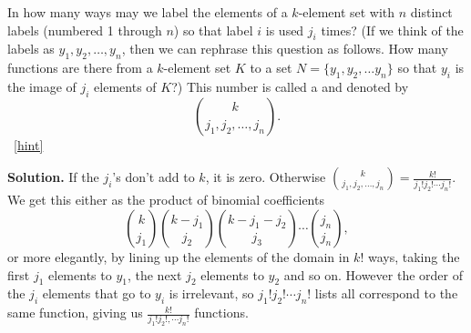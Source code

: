 \documentclass{book}
\begin{document}
\setcounter{project}{281}
\addtocounter{project}{-1}
\begin{activity}[]\label{activity-274}
\hypertarget{p-1493}{}%
In how many ways may we label the elements of a \(k\)-element set with \(n\) distinct labels (numbered 1 through \(n\)) so that label \(i\) is used \(j_i\) times? (If we think of the labels as \(y_1, y_2, \ldots, y_n\), then we can rephrase this question as follows.  How many functions are there from a \(k\)-element set \(K\) to a set \(N=\{y_1,y_2,\ldots y_n\}\) so that \(y_i\) is the image of \(j_i\) elements of \(K\)?) This number is called a  and denoted by%
\begin{equation*}
\binom{k}{j_1,j_2,\ldots, j_n}.
\end{equation*}
%
~\hfill{\tiny\hyperlink{a-281}{[hint]}\hypertarget{q-281}{}}\par\smallskip%
\noindent\textbf{Solution.}\hypertarget{solution-219}{}\quad%
\hypertarget{p-1496}{}%
If the \(j_i\)'s don't add to \(k\), it is zero.  Otherwise \(\binom{k}{j_1,j_2,\ldots, j_n} =
\frac{k!}{j_1!j_2!\cdots j_n!}\). We get this either as the product of binomial coefficients%
\begin{equation*}
\binom{k}{j_1}\binom{k-j_1}{j_2}\binom{k-j_1-j_2}{j_3}\cdots\binom{j_n}{j_n},
\end{equation*}
or more elegantly, by lining up the elements of the domain in \(k!\) ways, taking the first \(j_1\) elements to \(y_1\), the next \(j_2\) elements to \(y_2\) and so on.  However the order of the \(j_i\) elements that go to \(y_i\) is irrelevant, so \(j_1!j_2!\cdots j_n!\) lists all correspond to the same function, giving us \(\frac{k!}{j_1!j_2!,\cdots j_n!}\) functions.%
\end{activity}
\end{document}

